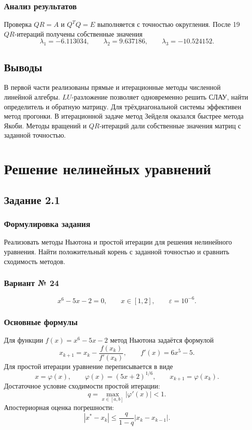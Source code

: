 \documentclass[12pt,a4paper]{article}
\newcommand{\eps}{\varepsilon}
\begin{document}
\subsubsection{Анализ результатов}
Проверка $QR=A$ и $Q^TQ=E$ выполняется с точностью округления.
После 19 $QR$-итераций получены собственные значения
\[
\lambda_1=-6.113034,\qquad
\lambda_2=9.637186,\qquad
\lambda_3=-10.524152.
\]

\subsection{Выводы}
В первой части реализованы прямые и итерационные методы численной линейной
алгебры. $LU$-разложение позволяет одновременно решить СЛАУ, найти
определитель и обратную матрицу. Для трёхдиагональной системы эффективен
метод прогонки. В итерационной задаче метод Зейделя оказался быстрее метода
Якоби. Методы вращений и $QR$-итераций дали собственные значения матриц с
заданной точностью.

\section{Решение нелинейных уравнений}

\subsection{Задание 2.1}

\subsubsection{Формулировка задания}
Реализовать методы Ньютона и простой итерации для решения нелинейного
уравнения. Найти положительный корень с заданной точностью и сравнить
сходимость методов.

\subsubsection{Вариант № 24}
\[
x^6-5x-2=0,\qquad x\in[1,2],\qquad \eps=10^{-6}.
\]

\subsubsection{Основные формулы}
Для функции $f(x)=x^6-5x-2$ метод Ньютона задаётся формулой
\[
x_{k+1}=x_k-\frac{f(x_k)}{f'(x_k)},\qquad f'(x)=6x^5-5.
\]
Для простой итерации уравнение переписывается в виде
\[
x=\varphi(x),\qquad \varphi(x)=(5x+2)^{1/6},\qquad
x_{k+1}=\varphi(x_k).
\]
Достаточное условие сходимости простой итерации:
\[
q=\max_{x\in[a,b]}|\varphi'(x)|<1.
\]
Апостериорная оценка погрешности:
\[
|x^*-x_k|\leq\frac{q}{1-q}|x_k-x_{k-1}|.
\]
\end{document}
